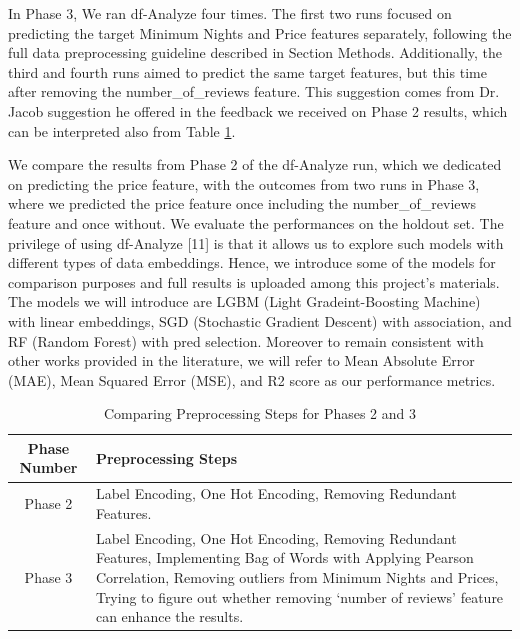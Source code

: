 \documentclass[a4paper,12pt]{article}
\begin{document}
In Phase 3, We ran df-Analyze four times. The first two runs focused on predicting the target Minimum Nights and Price features separately, following the full data preprocessing guideline described in Section Methods. Additionally, the third and fourth runs aimed to predict the same target features, but this time after removing the number\_of\_reviews feature. This suggestion comes from Dr. Jacob suggestion he offered in the feedback we received on Phase 2 results, which can be interpreted also from Table \ref{table_preprocessing_phases}.

We compare the results from Phase 2 of the df-Analyze run, which we dedicated on predicting the price feature, with the outcomes from two runs in Phase 3, where we predicted the price feature once including the number\_of\_reviews feature and once without. We evaluate the performances on the holdout set. The privilege of using df-Analyze [11] is that it allows us to explore such models with different types of data embeddings. Hence, we introduce some of the models for comparison purposes and full results is uploaded among this project's materials. The models we will introduce are LGBM (Light Gradeint-Boosting Machine) with linear embeddings, SGD (Stochastic Gradient Descent) with association, and RF (Random Forest) with pred selection. Moreover to remain consistent with other works provided in the literature, we will refer to Mean Absolute Error (MAE), Mean Squared Error (MSE), and R2 score as our performance metrics.

\begin{table}[h!]
\centering
\begin{tabular}{|c|p{10cm}|}
\hline
\textbf{Phase Number} & \textbf{Preprocessing Steps} \\ \hline
Phase 2 & Label Encoding, One Hot Encoding, Removing Redundant Features. \\ \hline
Phase 3 & Label Encoding, One Hot Encoding, Removing Redundant Features, Implementing Bag of Words with Applying Pearson Correlation, Removing outliers from Minimum Nights and Prices, Trying to figure out whether removing `number of reviews' feature can enhance the results. \\ \hline
\end{tabular}
\caption{Comparing Preprocessing Steps for Phases 2 and 3}
\label{table_preprocessing_phases}
\end{table}
\end{document}
